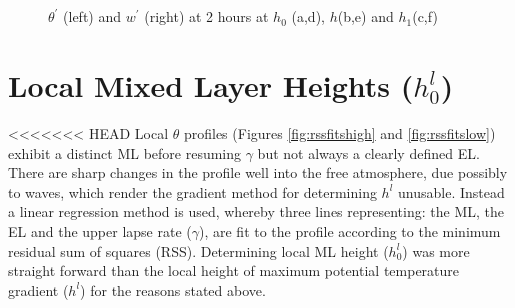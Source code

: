 \begin{figure}[htbp]
\caption{$\theta^{'}$ (left) and $w^{'}$ (right) at 2 hours at $h_{0}$ (a,d), $h$(b,e) and $h_{1}$(c,f)}
\begin{minipage}[b]{0.5\linewidth} 
        
        \\
        \\ 
 \end{minipage}             
\quad
\begin{minipage}[b]{0.5\linewidth}
        \\
       
       \\
        
\end{minipage}
        
        \label{fig:conts1}
\end{figure}

\clearpage


\section{Local Mixed Layer Heights ($h_{0}^{l}$)}
\label{sec:locmlh}     
\FloatBarrier

<<<<<<< HEAD
Local $\theta$ profiles (Figures \ref{fig:rssfitshigh} and \ref{fig:rssfitslow}) exhibit a distinct 
\acs{ML} before resuming $\gamma$ but 
not always a clearly defined \acs{EL}.  There are sharp changes in the profile well into the free 
atmosphere, due possibly to waves, which render the gradient method for determining $h^{l}$ 
unusable.  Instead a linear regression method is used, whereby three lines representing: the
 \acs{ML}, the \acs{EL} and the upper lapse rate ($\gamma$), are fit to the profile according 
to the minimum residual sum of squares (RSS).  Determining local \acs{ML} height ($h_{0}^{l}$) was 
more straight forward than the local height of maximum potential temperature gradient 
($h^{l}$) for the reasons stated above.\\  

